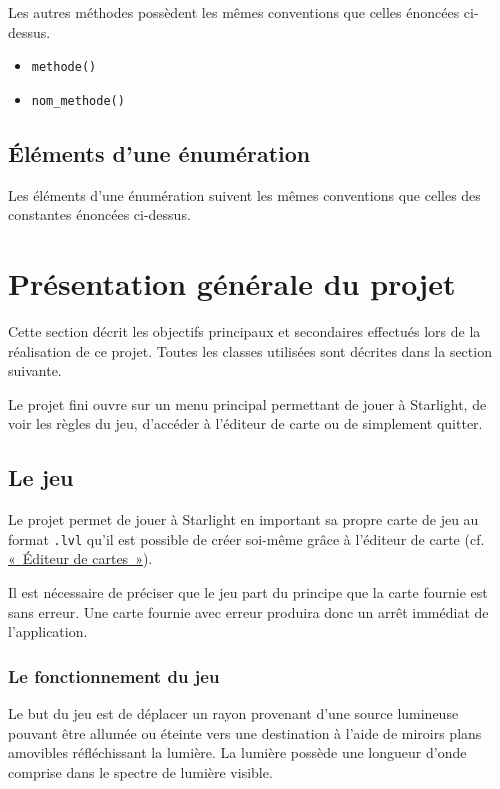 \documentclass[]{report}
\begin{document}
Les autres méthodes possèdent les mêmes conventions que celles
énoncées ci-dessus.

\begin{itemize}
	\item \texttt{methode()}
	\item \texttt{nom\_methode()}
\end{itemize}

\subsection{Éléments d'une énumération} 

Les éléments d'une énumération suivent les mêmes conventions que celles des constantes énoncées ci-dessus.

\newpage
\section{Présentation générale du projet}

Cette section décrit les objectifs principaux et secondaires effectués lors
de la réalisation de ce projet.
Toutes les classes utilisées sont décrites dans la section suivante.

Le projet fini ouvre sur un menu principal permettant
de jouer à Starlight, de voir les règles du jeu, d'accéder à l'éditeur de 
carte ou de simplement quitter.

\subsection{Le jeu}

Le projet permet de jouer à Starlight en important sa propre carte de jeu
au format \texttt{.lvl} qu'il est possible de créer soi-même grâce à l'éditeur
de carte (cf. \hyperref[Editeur]{«~Éditeur de cartes~»}).

Il est nécessaire de préciser que le jeu part du principe que la carte 
fournie est sans erreur. Une carte fournie avec erreur produira donc
un arrêt immédiat de l'application.

\subsubsection{Le fonctionnement du jeu}

Le but du jeu est de déplacer un rayon provenant d'une source lumineuse
pouvant être allumée ou éteinte
vers une destination à l'aide de miroirs plans amovibles réfléchissant
la lumière.
La lumière possède une longueur d'onde comprise dans le spectre
de lumière visible.
\end{document}
